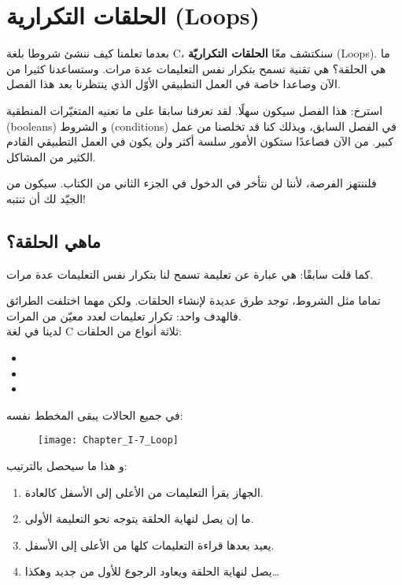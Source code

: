 \chapter{الحلقات التكرارية (\textenglish{Loops})}

بعدما تعلمنا كيف ننشئ شروطا بلغة 
\textenglish{C}،
سنكتشف معًا 
\textbf{الحلقات التكراريّة} (\textenglish{Loops}).
ما هي الحلقة؟ هي تقنية تسمح بتكرار نفس التعليمات عدة مرات. وستساعدنا كثيرا من الآن وصاعدا خاصة في العمل التطبيقي الأوّل الذي ينتظرنا بعد هذا الفصل.

استرخ: هذا الفصل سيكون سهلًا. لقد تعرفنا سابقا على ما تعنيه المتغيّرات المنطقية
(\textenglish{booleans})
و الشروط 
(\textenglish{conditions})
في الفصل السابق، وبذلك كنا قد تخلصنا من عمل كبير. من الآن فصاعدًا ستكون الأمور سلسة أكثر ولن يكون في العمل التطبيقي القادم الكثير من المشاكل.

فلننتهز الفرصة، لأننا لن نتأخر في الدخول في الجزء الثاني من الكتاب. سيكون من الجيّد لك أن تنتبه!

\section{ماهي الحلقة؟}

كما قلت سابقًا: هي عبارة عن تعليمة تسمح لنا بتكرار نفس التعليمات عدة مرات. 

تماما مثل الشروط، توجد طرق عديدة لإنشاء الحلقات. ولكن مهما اختلفت الطرائق فالهدف واحد: تكرار تعليمات لعدد معيّن من المرات. \\
لدينا في لغة 
\textenglish{C}
ثلاثة أنواع من الحلقات:
\begin{itemize}
	\item {}
	\item {}
	\item {}
\end{itemize}
في جميع الحالات يبقى المخطط نفسه:

\begin{figure}[H]
	\centering
	\texttt{[image: Chapter\_I-7\_Loop]}
\end{figure}
و هذا ما سيحصل بالترتيب:

\begin{enumerate}
	\item الجهاز يقرأ التعليمات من الأعلى إلى الأسفل كالعادة.
	\item ما إن يصل لنهاية الحلقة يتوجه نحو التعليمة الأولى.
	\item يعيد بعدها قراءة التعليمات كلها من الأعلى إلى الأسفل.
	\item يصل لنهاية الحلقة ويعاود الرجوع للأول من جديد وهكذا\dots
\end{enumerate}

